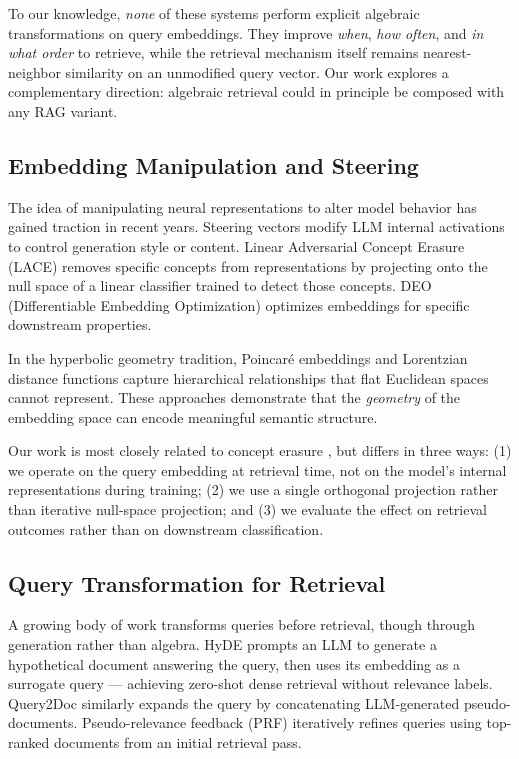 \documentclass{article}
\begin{document}
To our knowledge, \emph{none} of these systems perform explicit algebraic transformations on query embeddings. They improve \emph{when}, \emph{how often}, and \emph{in what order} to retrieve, while the retrieval mechanism itself remains nearest-neighbor similarity on an unmodified query vector. Our work explores a complementary direction: algebraic retrieval could in principle be composed with any RAG variant.

\subsection{Embedding Manipulation and Steering}

The idea of manipulating neural representations to alter model behavior has gained traction in recent years. Steering vectors \cite{turner2023} modify LLM internal activations to control generation style or content. Linear Adversarial Concept Erasure (LACE) \cite{ravfogel2022} removes specific concepts from representations by projecting onto the null space of a linear classifier trained to detect those concepts. DEO (Differentiable Embedding Optimization) optimizes embeddings for specific downstream properties.

In the hyperbolic geometry tradition, Poincar\'{e} embeddings \cite{nickel2017} and Lorentzian distance functions capture hierarchical relationships that flat Euclidean spaces cannot represent. These approaches demonstrate that the \emph{geometry} of the embedding space can encode meaningful semantic structure.

Our work is most closely related to concept erasure \cite{ravfogel2022}, but differs in three ways: (1) we operate on the query embedding at retrieval time, not on the model's internal representations during training; (2) we use a single orthogonal projection rather than iterative null-space projection; and (3) we evaluate the effect on retrieval outcomes rather than on downstream classification.

\subsection{Query Transformation for Retrieval}

A growing body of work transforms queries before retrieval, though through generation rather than algebra. HyDE \cite{gao2023hyde} prompts an LLM to generate a hypothetical document answering the query, then uses its embedding as a surrogate query --- achieving zero-shot dense retrieval without relevance labels. Query2Doc \cite{wang2023query2doc} similarly expands the query by concatenating LLM-generated pseudo-documents. Pseudo-relevance feedback (PRF) \cite{rocchio1971} iteratively refines queries using top-ranked documents from an initial retrieval pass.
\end{document}
